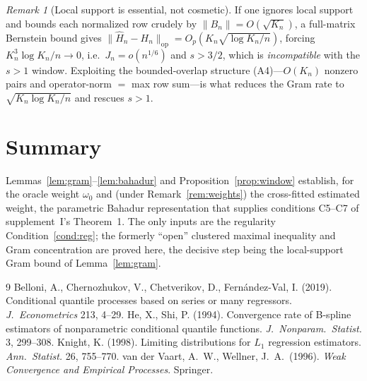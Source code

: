 \documentclass[11pt]{article}
\theoremstyle{remark}\newtheorem{remark}{Remark}
\newcommand{\op}{\mathrm{op}}
\begin{document}
\begin{remark}[Local support is essential, not cosmetic]\label{rem:essential}
If one ignores local support and bounds each normalized row crudely by
$\|B_n\|=O(\sqrt{K_n})$, a full-matrix Bernstein bound gives
$\|\widehat H_n-H_n\|_\op=O_p(K_n\sqrt{\log K_n/n})$, forcing
$K_n^3\log K_n/n\to0$, i.e.\ $J_n=o(n^{1/6})$ and $s>3/2$, which is
\emph{incompatible} with the $s>1$ window. Exploiting the bounded-overlap
structure (A4)---$O(K_n)$ nonzero pairs and operator-norm $=$ max row sum---is
what reduces the Gram rate to $\sqrt{K_n\log K_n/n}$ and rescues $s>1$.
\end{remark}

\section{Summary}
Lemmas~\ref{lem:gram}--\ref{lem:bahadur} and Proposition~\ref{prop:window}
establish, for the oracle weight $\omega_0$ and (under
Remark~\ref{rem:weights}) the cross-fitted estimated weight, the parametric
Bahadur representation that supplies conditions C5--C7 of supplement~I's
Theorem~1. The only inputs are the regularity Condition~\ref{cond:reg}; the
formerly ``open'' clustered maximal inequality and Gram concentration are proved
here, the decisive step being the local-support Gram bound of
Lemma~\ref{lem:gram}.

\begin{thebibliography}{9}
 Belloni, A., Chernozhukov, V.,
Chetverikov, D., Fern\'andez-Val, I. (2019). Conditional quantile processes
based on series or many regressors. \emph{J.\ Econometrics} 213, 4--29.
 He, X., Shi, P. (1994). Convergence rate of
B-spline estimators of nonparametric conditional quantile functions.
\emph{J.\ Nonparam.\ Statist.} 3, 299--308.
 Knight, K. (1998). Limiting distributions for
$L_1$ regression estimators. \emph{Ann.\ Statist.} 26, 755--770.
 van der Vaart, A.\ W.,
Wellner, J.\ A.\ (1996). \emph{Weak Convergence and Empirical Processes}.
Springer.
\end{thebibliography}
\end{document}
